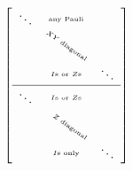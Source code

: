 \documentclass[]{standalone}
\begin{document}
$\left[
\begin{array}{ccc}
  \ddots & ^{\scriptscriptstyle \text{any Pauli}} &  \\
  & {\rotatebox[origin=c]{-35}{$\scriptscriptstyle XY\text{ diagonal}$}} & \\
  & ^{\scriptscriptstyle I\text{s or }Z\text{s}} & \ddots \\
  \hline
  \ddots & ^{\scriptscriptstyle I\text{s or }Z\text{s}} & \\
  & {\rotatebox[origin=c]{-35}{$\scriptscriptstyle \ \ Z\text{ diagonal}$}} & \\
  & ^{\scriptscriptstyle I\text{s only}} & \ddots
\end{array}
\right]$
\end{document}
